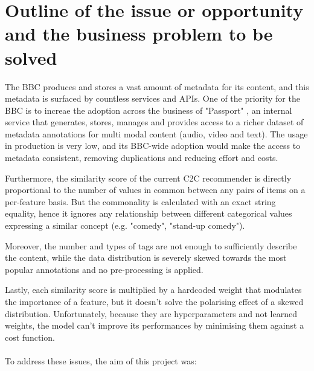 
\section{Outline of the issue or opportunity and the business problem to be solved}

The BBC produces and stores a vast amount of metadata for its content, and this metadata is surfaced by countless services and APIs.
One of the priority for the BBC is to increae the adoption across the business of "Passport" \cite{BbcPassportMetadata}, an internal service that generates,
stores, manages and provides access to a richer dataset of metadata annotations for multi modal content (audio, video and text).
The usage in production is very low, and its BBC-wide adoption would make the access to metadata consistent,
removing duplications and reducing effort and costs.

Furthermore, the similarity score of the current C2C recommender is directly proportional to the number of values in common between any pairs of items
on a per-feature basis. But the commonality is calculated with an exact string equality, hence it ignores any relationship between different
categorical values expressing a similar concept (e.g. "comedy", "stand-up comedy").

Moreover, the number and types of tags are not enough to sufficiently
describe the content, while the data distribution is severely skewed towards the most popular annotations and no pre-processing
is applied.

Lastly, each similarity score is multiplied by a hardcoded weight that modulates the importance of a feature, but it doesn't solve
the polarising effect of a skewed distribution. Unfortunately, because they are hyperparameters and not learned weights, the model can't improve
its performances by minimising them against a cost function.
\\ \\
To address these issues, the aim of this project was:

